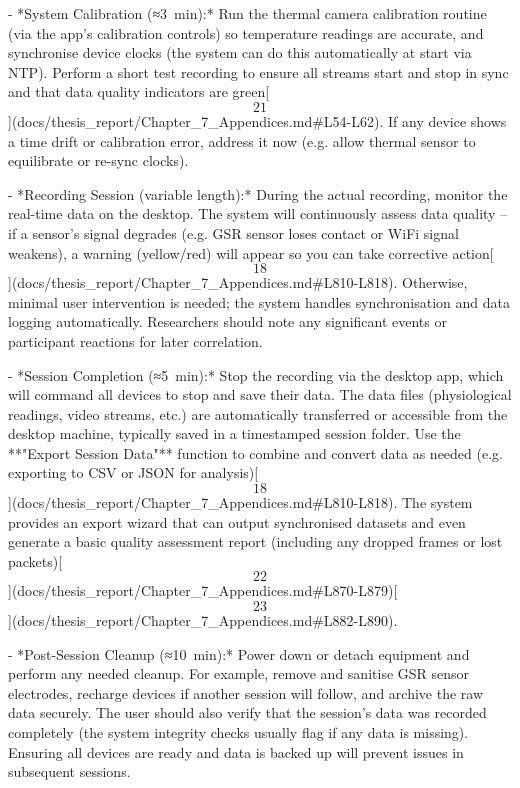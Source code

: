 \documentclass[12pt,a4paper]{article}
\begin{document}
{- *System Calibration (≈3 min):* Run the thermal camera calibration
  routine (via the app's calibration controls) so temperature readings
  are accurate, and synchronise device clocks (the system can do this
  automatically at start via NTP). Perform a short test recording to
  ensure all streams start and stop in sync and that data quality
  indicators are
  green[\[21\]](docs/thesis_report/Chapter_7_Appendices.md#L54-L62).
  If any device shows a time drift or calibration error, address it now
  (e.g. allow thermal sensor to equilibrate or re-sync clocks).

- *Recording Session (variable length):* During the actual recording,
  monitor the real-time data on the desktop. The system will
  continuously assess data quality -- if a sensor's signal degrades
  (e.g. GSR sensor loses contact or WiFi signal weakens), a warning
  (yellow/red) will appear so you can take corrective
  action[\[18\]](docs/thesis_report/Chapter_7_Appendices.md#L810-L818).
  Otherwise, minimal user intervention is needed; the system handles
  synchronisation and data logging automatically. Researchers should
  note any significant events or participant reactions for later
  correlation.

- *Session Completion (≈5 min):* Stop the recording via the desktop app,
  which will command all devices to stop and save their data. The data
  files (physiological readings, video streams, etc.) are automatically
  transferred or accessible from the desktop machine, typically saved in
  a timestamped session folder. Use the **"Export Session Data"**
  function to combine and convert data as needed (e.g. exporting to CSV
  or JSON for
  analysis)[\[18\]](docs/thesis_report/Chapter_7_Appendices.md#L810-L818).
  The system provides an export wizard that can output synchronised
  datasets and even generate a basic quality assessment report
  (including any dropped frames or lost
  packets)[\[22\]](docs/thesis_report/Chapter_7_Appendices.md#L870-L879)[\[23\]](docs/thesis_report/Chapter_7_Appendices.md#L882-L890).

- *Post-Session Cleanup (≈10 min):* Power down or detach equipment and
  perform any needed cleanup. For example, remove and sanitise GSR
  sensor electrodes, recharge devices if another session will follow,
  and archive the raw data securely. The user should also verify that
  the session's data was recorded completely (the system integrity
  checks usually flag if any data is missing). Ensuring all devices are
  ready and data is backed up will prevent issues in subsequent
  sessions.

}
\end{document}
